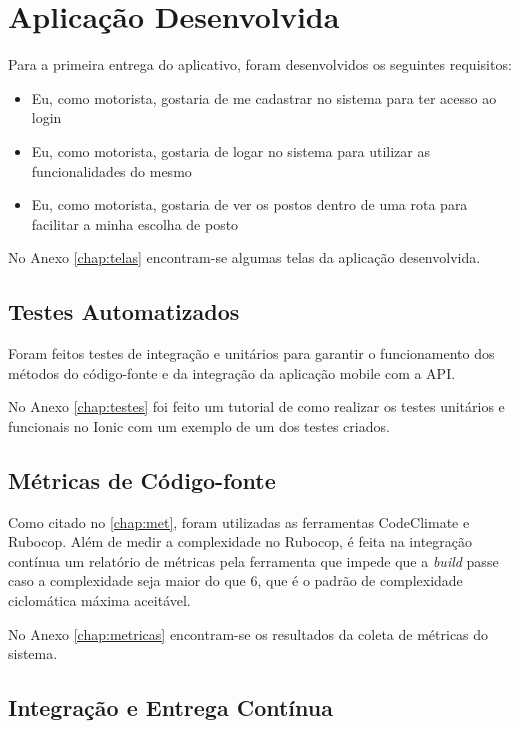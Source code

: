 \section{Aplicação Desenvolvida}
Para a primeira entrega do aplicativo, foram desenvolvidos os seguintes requisitos:
\begin{itemize}
    \item Eu, como motorista, gostaria de me cadastrar no sistema para ter acesso ao login
    \item Eu, como motorista, gostaria de logar no sistema para utilizar as funcionalidades do mesmo
    \item Eu, como motorista, gostaria de ver os postos dentro de uma rota para facilitar a minha escolha de posto
\end{itemize}
No Anexo \ref{chap:telas} encontram-se algumas telas da aplicação desenvolvida.

\subsection{Testes Automatizados}

Foram feitos testes de integração e unitários para garantir o funcionamento dos métodos do código-fonte e da integração da aplicação mobile com a API.

No Anexo \ref{chap:testes} foi feito um tutorial de como realizar os testes unitários e funcionais no Ionic com um exemplo de um dos testes criados.

\subsection{Métricas de Código-fonte}

Como citado no \autoref{chap:met}, foram utilizadas as ferramentas CodeClimate e Rubocop. Além de medir a complexidade no Rubocop, é feita na integração contínua um relatório de métricas pela ferramenta que impede que a \textit{build} passe caso a complexidade seja maior do que 6, que é o padrão de complexidade ciclomática máxima aceitável.

No Anexo \ref{chap:metricas} encontram-se os resultados da coleta de métricas do sistema.

\subsection{Integração e Entrega Contínua}


